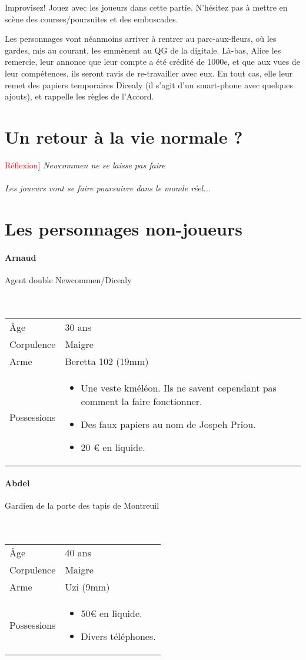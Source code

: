 \documentclass[10pt,a4paper,twocolumn]{article}
\newenvironment{lAbstract}[1]{{[}\textcolor{red}{#1}{]}\itshape}{\\ \\}
\begin{document}
Improvisez! Jouez avec les joueurs dans cette partie. N'hésitez pas à mettre en scène des courses/poursuites et des embuscades.

Les personnages vont néanmoins arriver à rentrer au parc-aux-fleurs, où les gardes, mis au courant, les emmènent au QG de la digitale. Là-bas, Alice les remercie, leur annonce que leur compte a été crédité de 1000e, et que aux vues de leur compétences, ils seront ravis de re-travailler avec eux. En tout cas, elle leur remet des papiers temporaires Dicealy (il s'agit d'un smart-phone avec quelques ajouts), et rappelle les règles de l'Accord.

\section{Un retour à la vie normale ?}
\begin{lAbstract}{Réflexion}
Newcommen ne se laisse pas faire
\end{lAbstract}
Les joueurs vont se faire poursuivre dans le monde réel...

\newpage
\section*{Les personnages non-joueurs}
\hypertarget{arnaud}{\paragraph{Arnaud}} Agent double Newcommen/Dicealy\\ \\
\
\begin{tabular}{l|p{}}
	Âge & 30 ans\\
	Corpulence & Maigre \\
	Arme & Beretta 102 (19mm) \\
	Possessions & \begin{itemize}
	\item Une veste kméléon. Ils ne savent cependant pas comment la faire fonctionner.
	\item Des faux papiers au nom de Jospeh Priou.
	\item 20 € en liquide.
\end{itemize} \\
\end{tabular}
\hypertarget{abdel}{\paragraph{Abdel}} Gardien de la porte des tapis de Montreuil\\ \\
\
\begin{tabular}{l|p{0.3\textwidth}}
	Âge & 40 ans\\
	Corpulence & Maigre \\
	Arme & Uzi (9mm) \\
	Possessions & \begin{itemize}
	\item 50€ en liquide.
	\item Divers téléphones.
\end{itemize}	 \\
\end{tabular}
\end{document}
